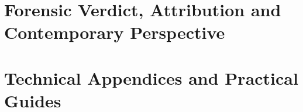 \documentclass[10pt,twoside,openright]{book}
\begin{document}
\part{Forensic Verdict, Attribution and Contemporary Perspective}




\appendix
\part{Technical Appendices and Practical Guides}







\backmatter




\end{document}
